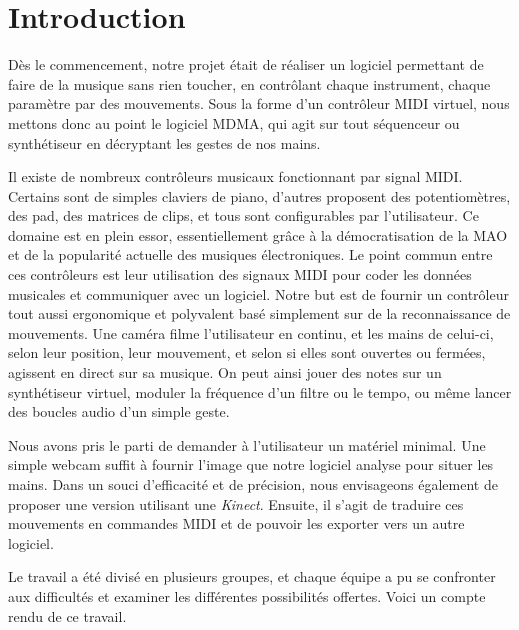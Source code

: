 


\maketitle
\newpage

\tableofcontents
\newpage
\section{Introduction}
\par Dès le commencement, notre projet était de réaliser un logiciel permettant de faire de la musique sans rien toucher, en contrôlant chaque instrument, chaque paramètre par des mouvements. Sous la forme d'un contrôleur MIDI virtuel, nous mettons donc au point le logiciel MDMA, qui agit sur tout séquenceur ou synthétiseur en décryptant les gestes de nos mains.
\par Il existe de nombreux contrôleurs musicaux fonctionnant par signal MIDI. Certains sont de simples claviers de piano, d'autres proposent des potentiomètres, des pad, des matrices de clips, et tous sont configurables par l'utilisateur. Ce domaine est en plein essor, essentiellement grâce à la démocratisation de la MAO et de la popularité actuelle des musiques électroniques. Le point commun entre ces contrôleurs est leur utilisation des signaux MIDI pour coder les données musicales et communiquer avec un logiciel. Notre but est de fournir un contrôleur tout aussi ergonomique et polyvalent basé simplement sur de la reconnaissance de mouvements. Une caméra filme l'utilisateur en continu, et les mains de celui-ci, selon leur position, leur mouvement, et selon si elles sont ouvertes ou fermées, agissent en direct sur sa musique. On peut ainsi jouer des notes sur un synthétiseur virtuel, moduler la fréquence d'un filtre ou le tempo, ou même lancer des boucles audio d'un simple geste. 
\par Nous avons pris le parti de demander à l'utilisateur un matériel minimal. Une simple webcam suffit à fournir l'image que notre logiciel analyse pour situer les mains. Dans un souci d'efficacité et de précision, nous envisageons également de proposer une version utilisant une \emph{Kinect}. Ensuite, il s'agit de traduire ces mouvements en commandes MIDI et de pouvoir les exporter vers un autre logiciel.
\par Le travail a été divisé en plusieurs groupes, et chaque équipe a pu se confronter aux difficultés et examiner les différentes possibilités offertes. Voici un compte rendu de ce travail.



